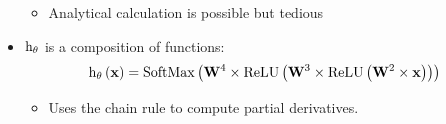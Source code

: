 \begin{frame}
\begin{itemize}
    \begin{itemize}
    \item Analytical calculation is possible but tedious
    \end{itemize}
  \item $\mathrm{h}_{\mathbf{\theta}}$ is a
      composition of functions:
      \[
        \apply{\decisionFunc_{\params}}{\example} = \apply{\softMaxFunc}{%
          \weightMatrix^4 \times
          \apply{\ReLUFunc}{%
            \weightMatrix^3 \times
            \apply{\ReLUFunc}{%
              \weightMatrix^2 \times \example
            }
          }
        }
      \]
      \begin{itemize}
      \item Uses the chain rule to compute partial derivatives.
      \end{itemize}
  \end{itemize}

\end{frame}

